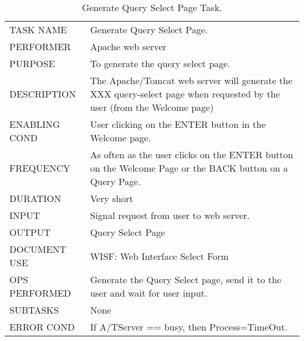 \documentclass{article}
\begin{document}
\begin{table}[h!]
  \centering
  \caption{Generate Query Select Page Task.}
  \label{tab:table5}
  \begin{tabular}{lp{10cm}}
       \hline
     TASK NAME & Generate Query Select Page.\\
     PERFORMER & Apache web server\\
     PURPOSE & To generate the query select page.\\
     DESCRIPTION & The Apache/Tomcat web server will generate the XXX query-select page when requested by the user (from the Welcome page) \\
     ENABLING COND & User clicking on the ENTER button in the Welcome page. \\
     FREQUENCY & As often as the user clicks on the ENTER button on the Welcome Page or the BACK button on a Query Page. \\
     DURATION & Very short\\
     INPUT & Signal request from user to web server. \\
     OUTPUT & Query Select Page\\
     DOCUMENT USE & WISF: Web Interface Select Form\\
     OPS PERFORMED & Generate the Query Select page, send it to the user and wait for user input. \\
     SUBTASKS & None\\
     ERROR COND &  If A/TServer == busy, then Process=TimeOut. \\
       \hline
  \end{tabular}
\end{table}
\end{document}
